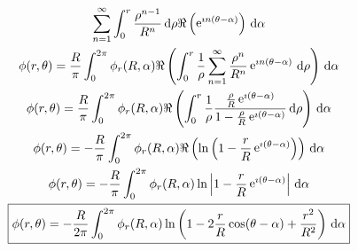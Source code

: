 {\begin{Solution}
\begin{gather*}
    \sum_{n=1}^\infty \int_0^r \frac{\rho^{n-1}}{R^n} \,\mathrm{d} \rho
    \Re \left( \mathop{\mathrm{e}}\nolimits^{\imath n (\theta-\alpha)} \right) \,\mathrm{d} \alpha \\
    \phi(r,\theta) = \frac{R}{\pi} \int_0^{2 \pi} \phi_r(R,\alpha) 
    \Re \left( \int_0^r \frac{1}{\rho} \sum_{n=1}^\infty
      \frac{\rho^n}{R^n} \mathop{\mathrm{e}}\nolimits^{\imath n (\theta-\alpha)} \,\mathrm{d} \rho
    \right) \,\mathrm{d} \alpha \\
    \phi(r,\theta) = \frac{R}{\pi} \int_0^{2 \pi} \phi_r(R,\alpha) 
    \Re \left( \int_0^r \frac{1}{\rho} 
      \frac{ \frac{\rho}{R} \mathop{\mathrm{e}}\nolimits^{\imath (\theta - \alpha)} }
      { 1 - \frac{\rho}{R} \mathop{\mathrm{e}}\nolimits^{\imath (\theta - \alpha)} }
      \,\mathrm{d} \rho \right) \,\mathrm{d} \alpha \\
    \phi(r,\theta) = - \frac{R}{\pi} \int_0^{2 \pi} \phi_r(R,\alpha) 
    \Re \left( \ln \left( 1 - \frac{r}{R} \mathop{\mathrm{e}}\nolimits^{\imath (\theta - \alpha)}
      \right) \right) \,\mathrm{d} \alpha \\
    \phi(r,\theta) = - \frac{R}{\pi} \int_0^{2 \pi} \phi_r(R,\alpha) 
    \ln \left| 1 - \frac{r}{R} \mathop{\mathrm{e}}\nolimits^{\imath (\theta - \alpha)}
    \right| \,\mathrm{d} \alpha \\
    \boxed{
      \phi(r,\theta) = - \frac{R}{2 \pi} \int_0^{2 \pi} \phi_r(R,\alpha) 
      \ln \left( 1 - 2 \frac{r}{R} \cos(\theta - \alpha)
        + \frac{r^2}{R^2} \right) \,\mathrm{d} \alpha 
      }
  \end{gather*}
\end{Solution}








}
